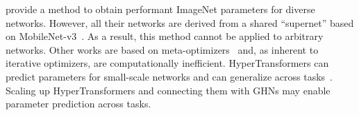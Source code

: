 \citet{cai2019once} provide a method to obtain performant ImageNet parameters for diverse networks. However, all their networks are derived from a shared ``supernet'' based on MobileNet-v3~\citep{howard2019searching}. As a result, this method cannot be applied to arbitrary networks.
Other works are based on meta-optimizers~\citep{ravi2016optimization,metz2020tasks,wichrowska2017learned} and, as inherent to iterative optimizers, are computationally inefficient.
HyperTransformers can predict parameters for small-scale networks and can generalize across tasks~\citep{anonymous2021HyperTransformer}. Scaling up HyperTransformers and connecting them with GHNs may enable parameter prediction across tasks.
